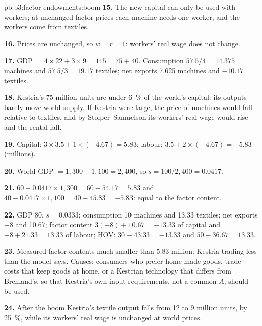 \begin{solution}{pb:b3:factor-endowments:boom}
\textbf{15.} The new capital can only be used with workers; at unchanged factor
prices each machine needs one worker, and the workers come from textiles.

\textbf{16.} Prices are unchanged, so $w = r = 1$: workers' real wage does not change.

\textbf{17.} GDP $= 4 \times 22 + 3 \times 9 = 115 = 75 + 40$. Consumption $57.5/4 = 14.375$
machines and $57.5/3 = 19.17$ textiles; net exports 7.625 machines and $-10.17$
textiles.

\textbf{18.} Kestria's 75 million units are under 6~\% of the world's capital: its
outputs barely move world supply. If Kestria were large, the price of machines
would fall relative to textiles, and by Stolper--Samuelson its workers' real wage
would rise and the rental fall.

\textbf{19.} Capital: $3 \times 3.5 + 1 \times (-4.67) = 5.83$; labour: $3.5 + 2 \times (-4.67) =
-5.83$ (millions).

\textbf{20.} World GDP $= 1{,}300 + 1{,}100 = 2{,}400$, so $s = 100/2{,}400 = 0.0417$.

\textbf{21.} $60 - 0.0417 \times 1{,}300 = 60 - 54.17 = 5.83$ and $40 - 0.0417 \times 1{,}100 = 40 -
45.83 = -5.83$: equal to the factor content.

\textbf{22.} GDP 80, $s = 0.0333$; consumption 10 machines and 13.33 textiles; net
exports $-8$ and 10.67; factor content $3(-8) + 10.67 = -13.33$ of capital and $-8 +
21.33 = 13.33$ of labour; HOV: $30 - 43.33 = -13.33$ and $50 - 36.67 = 13.33$.

\textbf{23.} Measured factor contents much smaller than 5.83 million: Kestria
trading less than the model says. Causes: consumers who prefer home-made goods,
trade costs that keep goods at home, or a Kestrian technology that differs from
Brenland's, so that Kestria's own input requirements, not a common $A$, should be
used.

\textbf{24.} After the boom Kestria's textile output falls from 12 to 9 million
units, by 25~\%, while its workers' real wage is unchanged at world prices.
\end{solution}
